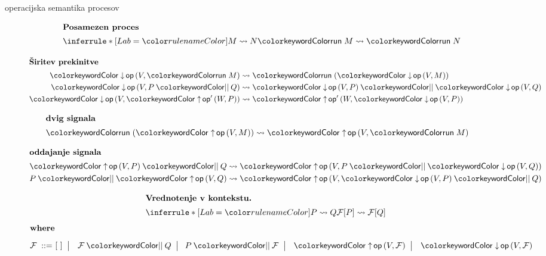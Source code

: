 \documentclass{beamer}
\theoremstyle{definition} %
\theoremstyle{plain} %
\begin{document}
	\begin{frame}{\lae{} operacijska semantika procesov}
		\begin{figure}[tp]
			\parbox{\textwidth}{
				\centering
				\tiny
				\begin{minipage}[t]{0.4\textwidth}
					\centering
					\begin{align*}
					\shortintertext{\textbf{Posamezen proces}}
					\coopinfer{}{
						M \reduces N
					}{
						\tmrun M \reduces \tmrun N
					}
					\end{align*}
				\end{minipage}
				\qquad
				\begin{minipage}[t]{0.4\textwidth}
					\centering
					\begin{align*}
					\shortintertext{\textbf{Širitev prekinitve}}
					\tmopin{op}{V}{\tmrun M} &\reduces \tmrun {(\tmopin{op}{V}{M})}
					\\
					\tmopin{op}{V}{\tmpar P Q} &\reduces \tmpar {\tmopin{op}{V}{P}} {\tmopin{op}{V}{Q}}
					\\
					\tmopin{op}{V}{\tmopout{op'}{W}{P}} &\reduces \tmopout{op'}{W}{\tmopin{op}{V}{P}}
					\end{align*}
				\end{minipage}
			
				
				
				
				\begin{minipage}[t]{0.4\textwidth}
					\centering
					\begin{align*}
					\shortintertext{\textbf{dvig signala}}
					\tmrun {(\tmopout{op}{V}{M})}  &\reduces \tmopout{op}{V}{\tmrun M}
					\end{align*}
				\end{minipage}
				\qquad
				\begin{minipage}[t]{0.4\textwidth}
					\centering
					\begin{align*}
					\shortintertext{\textbf{oddajanje signala}}
					\tmpar{\tmopout{op}{V}{P}}{Q} &\reduces \tmopout{op}{V}{\tmpar{P}{\tmopin{op}{V}{Q}}}
					\\
					\tmpar{P}{\tmopout{op}{V}{Q}} &\reduces \tmopout{op}{V}{\tmpar{\tmopin{op}{V}{P}}{Q}}
					\end{align*}
				\end{minipage}
				
		
				\begin{align*}
				\shortintertext{\quad\textbf{Vrednotenje v kontekstu.}}
				\quad
				\coopinfer{}{
					P \reduces Q
				}{
					\F[P] \reduces \F[Q]
				}
				\end{align*}
				\vspace{-8ex}
				\begin{align*}
				\shortintertext{\textbf{where}\vspace{1ex}}
				\text{$\F$}
				\bnfis& [~]
				\bnfor \tmpar \F Q \bnfor\! \tmpar P \F
				\bnfor \tmopout{op}{V}{\F}
				\bnfor \tmopin{op}{V}{\F}
				\end{align*}
			} 
		\end{figure}
	\end{frame}
\end{document}
